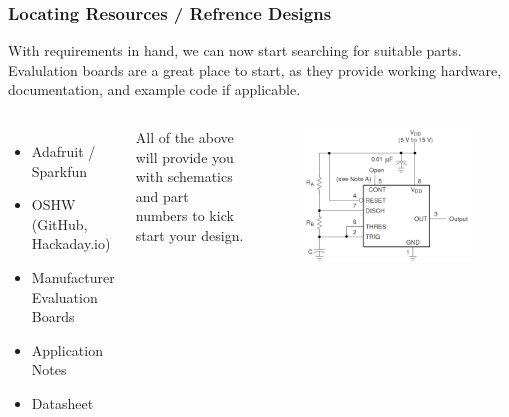 \documentclass[aspectratio=169, t]{beamer}
\begin{document}
\begin{frame}
\frametitle{Locating Resources / Refrence Designs}
With requirements in hand, we can now start searching for suitable parts.\\
Evalulation boards are a great place to start, as they provide working hardware, documentation, and example code if applicable.\\[10pt]
\begin{columns}
		\vspace{-7mm}
		\begin{itemize}
			\item Adafruit / Sparkfun
			\item OSHW (GitHub, Hackaday.io)
			\item Manufacturer Evaluation Boards
			\item Application Notes
			\item Datasheet
		\end{itemize}
		\vspace{2mm}
		All of the above will provide you with schematics and part numbers to kick start your design.

	\vspace{-8mm}
		\begin{figure}
			\includegraphics[width=0.8\linewidth]{images/tlc555-appnote.png}
		\end{figure}
\end{columns}
\end{frame}
\end{document}
